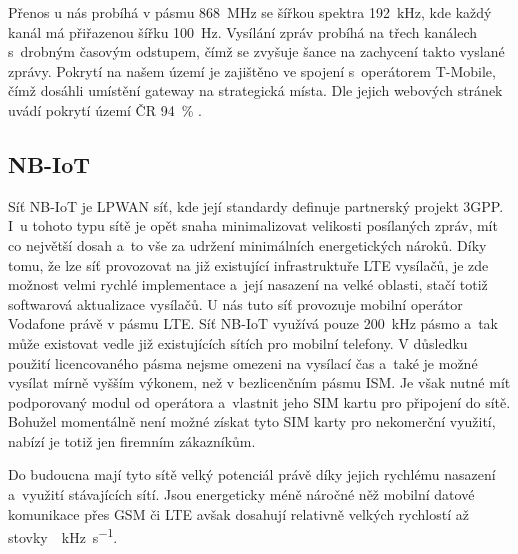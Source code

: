 Přenos u nás probíhá v pásmu \SI{868}{\mega\hertz} se šířkou spektra \SI{192}{\kilo\hertz}, kde každý kanál má přiřazenou šířku \SI{100}{\hertz}. Vysílání zpráv probíhá na třech kanálech s~drobným časovým odstupem, čímž se zvyšuje šance na zachycení takto vyslané zprávy. Pokrytí na našem území je zajištěno ve spojení s~operátorem T-Mobile, čímž dosáhli umístění gateway na strategická místa. Dle jejich webových stránek uvádí pokrytí území ČR \SI{94}{\percent} \cite{Sigfox_pokryti}.

\subsection{NB-IoT}

Síť NB-IoT je LPWAN síť, kde její standardy definuje partnerský projekt 3GPP\cite{3GPP}. I~u tohoto typu sítě je opět snaha minimalizovat velikosti posílaných zpráv, mít co největší dosah a~to vše za udržení minimálních energetických nároků. Díky tomu, že lze síť provozovat na již existující infrastruktuře LTE vysílačů, je zde možnost velmi rychlé implementace a~její nasazení na velké oblasti, stačí totiž softwarová aktualizace vysílačů. U nás tuto síť provozuje mobilní operátor Vodafone právě v pásmu LTE. Síť NB-IoT využívá pouze \SI{200}{\kilo\hertz} pásmo a~tak může existovat vedle již existujících sítích pro mobilní telefony. V důsledku použití licencovaného pásma nejsme omezeni na vysílací čas a~také je možné vysílat mírně vyšším výkonem, než v bezlicenčním pásmu ISM. Je však nutné mít podporovaný modul od operátora a~vlastnit jeho SIM kartu pro připojení do sítě. Bohužel momentálně není možné získat tyto SIM karty pro nekomerční využití, nabízí je totiž jen firemním zákazníkům. 

Do budoucna mají tyto sítě velký potenciál právě díky jejich rychlému nasazení a~využití stávajících sítí. Jsou energeticky méně náročné něž mobilní datové komunikace přes GSM či LTE avšak dosahují relativně velkých rychlostí až stovky~\SI{}{\kilo\hertz\per\second}.